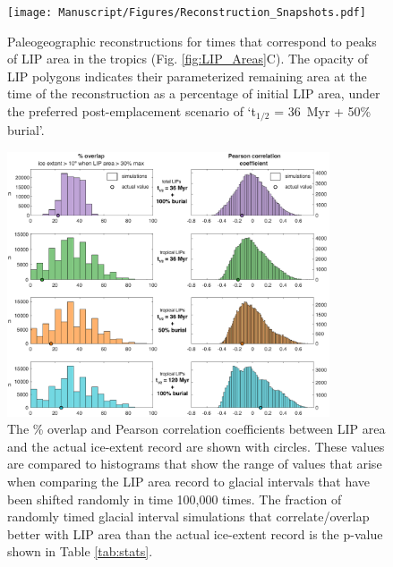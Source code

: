 \documentclass[11pt,letterpaper]{article}
\begin{document}
\begin{figure}[h!]
\begin{center}
	\texttt{[image: Manuscript/Figures/Reconstruction\_Snapshots.pdf]}
	\caption{Paleogeographic reconstructions for times that correspond to peaks of LIP area in the tropics (Fig. \ref{fig:LIP_Areas}C). The opacity of LIP polygons indicates their parameterized remaining area at the time of the reconstruction as a percentage of initial LIP area, under the preferred post-emplacement scenario of `t$_{1/2}$ = 36~Myr + 50\% burial'.}
	\label{fig:Reconstruction_Snapshots}
\end{center}
\end{figure}

\begin{figure}[h!]
\begin{center}
	\includegraphics[width=0.85\textwidth]{Manuscript/Figures/overlap_correlation_cropped.pdf}
	\caption{The \% overlap and Pearson correlation coefficients between LIP area and the actual ice-extent record are shown with circles. These values are compared to histograms that show the range of values that arise when comparing the LIP area record to glacial intervals that have been shifted randomly in time 100,000 times. The fraction of randomly timed glacial interval simulations that correlate/overlap better with LIP area than the actual ice-extent record is the p-value shown in Table \ref{tab:stats}.}
	\label{fig:LIP_correlation}
\end{center}
\end{figure}

\clearpage
\newpage
\footnotesize

\singlespacing



\end{document}
